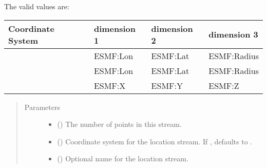 \documentclass[letterpaper,10pt,english]{sphinxmanual}
\begin{document}
\begin{fulllineitems}
The valid values are:


\begin{savenotes}\sphinxattablestart
\centering
\begin{tabulary}{\linewidth}[t]{|T|T|T|T|}
\hline
\sphinxstyletheadfamily 
Coordinate System
&\sphinxstyletheadfamily 
dimension 1
&\sphinxstyletheadfamily 
dimension 2
&\sphinxstyletheadfamily 
dimension 3
\\
\hline
{\hyperref[\detokenize{CoordSys:ESMF.api.constants.CoordSys.SPH_DEG}]{}}
&
ESMF:Lon
&
ESMF:Lat
&
ESMF:Radius
\\
\hline
{\hyperref[\detokenize{CoordSys:ESMF.api.constants.CoordSys.SPH_RAD}]{}}
&
ESMF:Lon
&
ESMF:Lat
&
ESMF:Radius
\\
\hline
{\hyperref[\detokenize{CoordSys:ESMF.api.constants.CoordSys.CART}]{}}
&
ESMF:X
&
ESMF:Y
&
ESMF:Z
\\
\hline
\end{tabulary}
\par
\sphinxattableend\end{savenotes}
\begin{quote}\begin{description}
\item[{Parameters}] \leavevmode\begin{itemize}
\item {} 
 () \textendash{} The number of points in this stream.

\item {} 
 ({\hyperref[\detokenize{CoordSys:ESMF.api.constants.CoordSys}]{}}) \textendash{} Coordinate system for the location stream.
If , defaults to {\hyperref[\detokenize{CoordSys:ESMF.api.constants.CoordSys.SPH_DEG}]{}}.

\item {} 
 () \textendash{} Optional name for the location stream.


\end{itemize}
\end{description}
\end{quote}
\end{fulllineitems}
\end{document}
